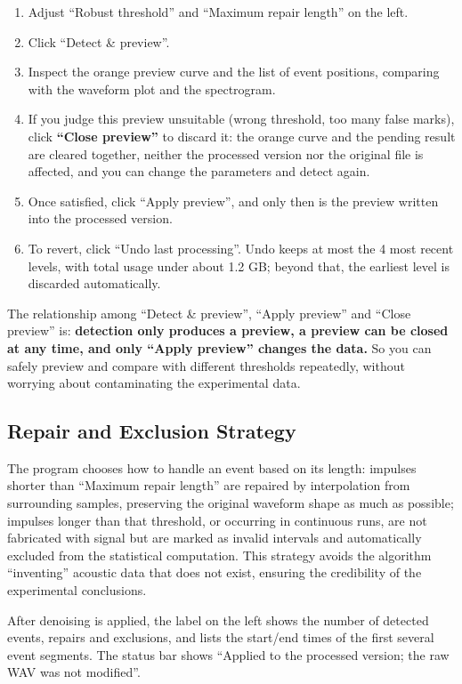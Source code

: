 \documentclass[UTF8,a4paper,12pt]{ctexart}
\begin{document}
\begin{enumerate}
  \item Adjust ``Robust threshold'' and ``Maximum repair length'' on the left.
  \item Click ``Detect \& preview''.
  \item Inspect the orange preview curve and the list of event positions, comparing with the waveform plot and the spectrogram.
  \item If you judge this preview unsuitable (wrong threshold, too many false marks), click \textbf{``Close preview''} to discard it: the orange curve and the pending result are cleared together, neither the processed version nor the original file is affected, and you can change the parameters and detect again.
  \item Once satisfied, click ``Apply preview'', and only then is the preview written into the processed version.
  \item To revert, click ``Undo last processing''. Undo keeps at most the 4 most recent levels, with total usage under about 1.2 GB; beyond that, the earliest level is discarded automatically.
\end{enumerate}

The relationship among ``Detect \& preview'', ``Apply preview'' and ``Close preview'' is: \textbf{detection only produces a preview, a preview can be closed at any time, and only ``Apply preview'' changes the data.} So you can safely preview and compare with different thresholds repeatedly, without worrying about contaminating the experimental data.

\subsection{Repair and Exclusion Strategy}

The program chooses how to handle an event based on its length: impulses shorter than ``Maximum repair length'' are repaired by interpolation from surrounding samples, preserving the original waveform shape as much as possible; impulses longer than that threshold, or occurring in continuous runs, are not fabricated with signal but are marked as invalid intervals and automatically excluded from the statistical computation. This strategy avoids the algorithm ``inventing'' acoustic data that does not exist, ensuring the credibility of the experimental conclusions.

After denoising is applied, the label on the left shows the number of detected events, repairs and exclusions, and lists the start/end times of the first several event segments. The status bar shows ``Applied to the processed version; the raw WAV was not modified''.
\end{document}
